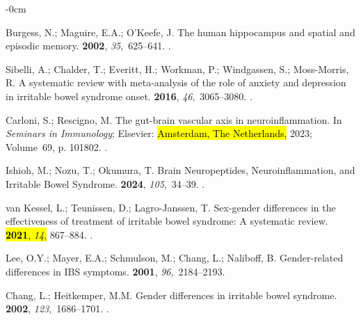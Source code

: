 \documentclass[diagnostics,article,accept,pdftex,moreauthors]{Definitions/mdpi}
\begin{document}
\begin{adjustwidth}{-\extralength}{0cm}
\begin{thebibliography}{999}
Burgess, N.; Maguire, E.A.; O'Keefe, J.
\newblock The human hippocampus and spatial and episodic memory.
 {\bf 2002}, {\em 35},~625--641.
.

Sibelli, A.; Chalder, T.; Everitt, H.; Workman, P.; Windgassen, S.;
  Moss-Morris, R.
\newblock A systematic review with meta-analysis of the role of anxiety and
  depression in irritable bowel syndrome onset.
 {\bf 2016}, {\em 46},~3065--3080.
.

Carloni, S.; Rescigno, M.
\newblock The gut-brain vascular axis in neuroinflammation.
\newblock In  \emph{Seminars in Immunology}; Elsevier:  \hl{Amsterdam, The Netherlands,} %
  2023;
  Volume~69, p. 101802.
.

Ishioh, M.; Nozu, T.; Okumura, T.
\newblock Brain Neuropeptides, Neuroinflammation, and Irritable Bowel Syndrome.
 {\bf 2024}, {\em 105},~34--39.
.

van Kessel, L.; Teunissen, D.; Lagro-Janssen, T.
\newblock Sex-gender differences in the effectiveness of treatment of irritable
  bowel syndrome: A systematic review.
 \hl{\textbf{2021}, \emph{14},} 867--884.
.

Lee, O.Y.; Mayer, E.A.; Schmulson, M.; Chang, L.; Naliboff, B.
\newblock Gender-related differences in IBS symptoms.
 {\bf 2001}, {\em 96},~2184--2193.


Chang, L.; Heitkemper, M.M.
\newblock Gender differences in irritable bowel syndrome.
 {\bf 2002}, {\em 123},~1686--1701.
.


\end{thebibliography}
\end{adjustwidth}
\end{document}
